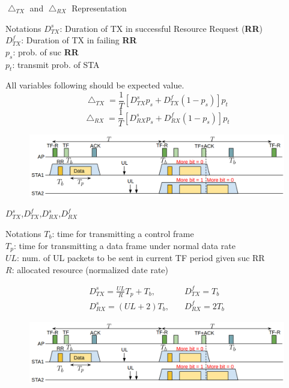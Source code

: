 \documentclass[10pt]{beamer}
\begin{document}
\begin{frame}{$\bigtriangleup_{TX}$ and $\bigtriangleup_{RX}$ Representation}
\begin{alertblock}{Notations}
	$D^s_{TX}$: Duration of TX in successful Resource Request (\textbf{RR})\\ 
	$D^f_{TX}$: Duration of TX in failing \textbf{RR} \\
    $p_s$: prob. of suc \textbf{RR} \\
    $p_t$: transmit prob. of STA
\end{alertblock}
All variables following should be expected value.
\begin{equation}
\label{equ_tx}
\bigtriangleup_{TX} = \frac{1}{T}[D_{TX}^sp_s + D_{TX}^f (1-p_s)]p_t
\end{equation}
\begin{equation}
\label{equ_rx}
\bigtriangleup_{RX} = \frac{1}{T}[D_{RX}^sp_s + D_{RX}^f (1-p_s)]p_t
\end{equation}
\begin{figure}
\includegraphics[scale=0.25]{./figure/ps_ax.png}
\label{fig_ps_ax_2}
\end{figure}
\end{frame}

\begin{frame}{$D_{TX}^s$,$D_{TX}^f$,$D_{RX}^s$,$D_{RX}^f$}
\begin{alertblock}{Notations}
    $T_b$: time for transmitting a control frame \\
	$T_p$: time for transmitting a data frame under normal data rate\\
	$UL$: num. of UL packets to be sent in current TF period given suc RR\\        
    $R$: allocated resource  (normalized date rate)
\end{alertblock}
\begin{align}
D_{TX}^s = \frac{UL}{R}T_p + T_b,\quad
 &D_{TX}^f = T_b \\
D_{RX}^s =  (UL + 2)T_b,\quad
 & D_{RX}^f = 2T_b
\end{align}
\begin{figure}
\includegraphics[scale=0.25]{./figure/ps_ax.png}
\label{fig_ps_ax_2}
\end{figure}
\end{frame}
\end{document}
